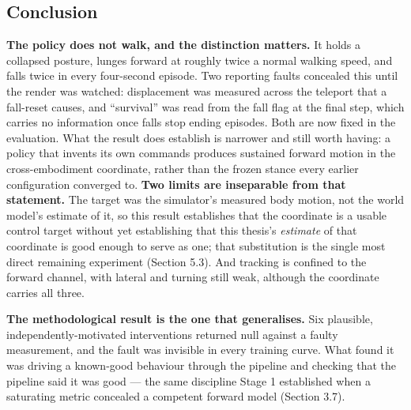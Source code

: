 \documentclass[12pt,a4paper,oneside]{report}
\begin{document}
\subsection{Conclusion}
\textbf{The policy does not walk, and the distinction matters.} It holds a collapsed posture, lunges forward at
roughly twice a normal walking speed, and falls twice in every four-second episode. Two reporting faults concealed
this until the render was watched: displacement was measured across the teleport that a fall-reset causes, and
``survival'' was read from the fall flag at the final step, which carries no information once falls stop ending
episodes. Both are now fixed in the evaluation. What the result does establish is narrower and still worth having:
a policy that invents its own commands produces sustained forward motion in the cross-embodiment coordinate,
rather than the frozen stance every earlier configuration converged to. \textbf{Two limits are inseparable from that
statement.} The target was the simulator's measured body motion, not the world model's estimate of it, so this
result establishes that the coordinate is a usable control target without yet establishing that this thesis's
\emph{estimate} of that coordinate is good enough to serve as one; that substitution is the single most direct
remaining experiment (Section 5.3). And tracking is confined to the forward channel, with lateral and turning still
weak, although the coordinate carries all three.

\noindent\textbf{The methodological result is the one that generalises.} Six plausible, independently-motivated
interventions returned null against a faulty measurement, and the fault was invisible in every training curve. What
found it was driving a known-good behaviour through the pipeline and checking that the pipeline said it was good —
the same discipline Stage 1 established when a saturating metric concealed a competent forward model (Section 3.7).

\end{document}
